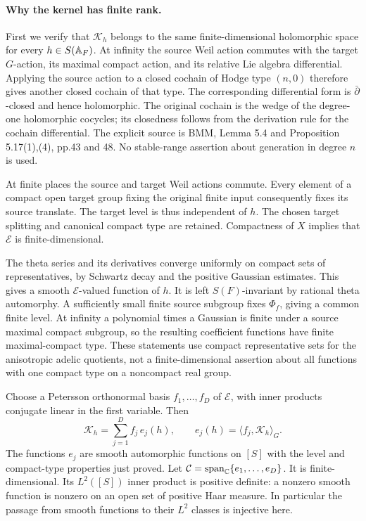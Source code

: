 \documentclass[11pt]{article}
\theoremstyle{definition}\newtheorem{definition}[theorem]{Definition}\newtheorem{remark}[theorem]{Remark}
\begin{document}
\paragraph{Why the kernel has finite rank.}
First we verify that $\mathcal K_h$ belongs to the same
finite-dimensional holomorphic space for every $h\in S(\mathbb A_F)$.
At infinity the source Weil action commutes with the target
$G$-action, its maximal compact action, and its relative Lie
algebra differential. Applying the source action to a closed
cochain of Hodge type $(n,0)$ therefore gives another closed
cochain of that type. The corresponding differential form is
$\bar\partial$-closed and hence holomorphic. The original cochain
is the wedge of the degree-one holomorphic cocycles; its
closedness follows from the derivation rule for the cochain
differential. The explicit source is BMM, Lemma 5.4 and
Proposition 5.17(1),(4), pp.43 and 48. No stable-range assertion
about generation in degree $n$ is used.

At finite places the source and target Weil actions commute.
Every element of a compact open target group fixing the original
finite input consequently fixes its source translate. The target
level is thus independent of $h$. The chosen target splitting
and canonical compact type are retained. Compactness of $X$
implies that $\mathcal E$ is finite-dimensional.

The theta series and its derivatives converge uniformly on compact
sets of representatives, by Schwartz decay and the positive
Gaussian estimates. This gives a smooth $\mathcal E$-valued
function of $h$. It is left $S(F)$-invariant by rational theta
automorphy. A sufficiently small finite source subgroup fixes
$\Phi_f$, giving a common finite level. At infinity a polynomial
times a Gaussian is finite under a source maximal compact
subgroup, so the resulting coefficient functions have finite
maximal-compact type. These statements use compact representative
sets for the anisotropic adelic quotients, not a finite-dimensional
assertion about all functions with one compact type on a
noncompact real group.

Choose a Petersson orthonormal basis
$f_1,\ldots,f_D$ of $\mathcal E$, with inner products conjugate
linear in the first variable. Then
\begin{equation}\label{A7-kernel}
 \mathcal K_h=\sum_{j=1}^D f_j\,e_j(h),
 \qquad e_j(h)=\langle f_j,\mathcal K_h\rangle_G .
\end{equation}
The functions $e_j$ are smooth automorphic functions on $[S]$
with the level and compact-type properties just proved.
Let $\mathcal C=\operatorname{span}_{\mathbb C}\{e_1,\ldots,e_D\}$.
It is finite-dimensional. Its $L^2([S])$ inner product is positive
definite: a nonzero smooth function is nonzero on an open set
of positive Haar measure. In particular the passage from smooth
functions to their $L^2$ classes is injective here.
\end{document}
